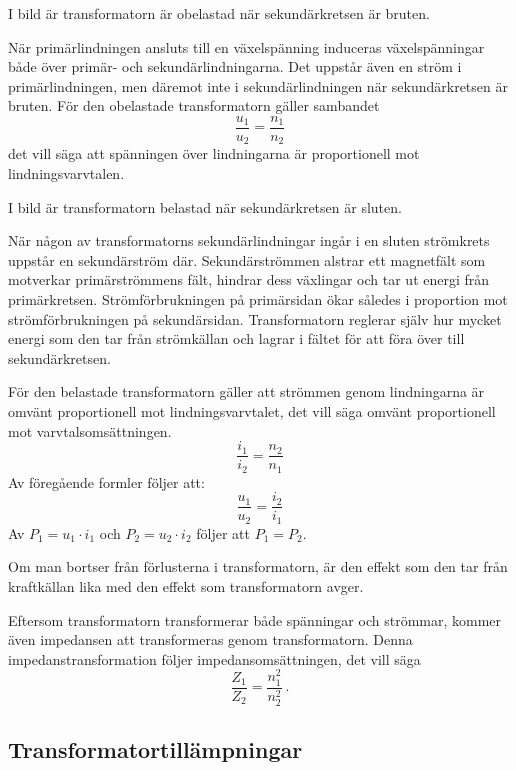 
I bild  är transformatorn är obelastad när sekundärkretsen
är bruten.

När primärlindningen ansluts till en växelspänning induceras växelspänningar
både över primär- och sekundärlindningarna.
Det uppstår även en ström i primärlindningen, men däremot inte i
sekundärlindningen när sekundärkretsen är bruten.
För den obelastade transformatorn gäller sambandet
\[\dfrac{u_1}{u_2} = \dfrac{n_1}{n_2}\]
det vill säga att spänningen över lindningarna är proportionell mot lindningsvarvtalen.

I bild  är transformatorn belastad när sekundärkretsen
är sluten.

När någon av transformatorns sekundärlindningar ingår i en sluten strömkrets 
uppstår en sekundärström där.
%
Sekundärströmmen alstrar ett magnetfält som motverkar primärströmmens fält,
hindrar dess växlingar och tar ut energi från primärkretsen.
%
Strömförbrukningen på primärsidan ökar således i proportion mot
strömförbrukningen på sekundärsidan. Transformatorn reglerar själv hur mycket
energi som den tar från strömkällan och lagrar i fältet för att föra över
till sekundärkretsen.

\newpage
För den belastade transformatorn gäller att strömmen genom lindningarna är
omvänt proportionell mot lindningsvarvtalet, det vill säga omvänt proportionell 
mot varvtalsomsättningen.
\[\dfrac{i_1}{i_2} = \dfrac{n_2}{n_1}\]
Av föregående formler följer att:
\[\dfrac{u_1}{u_2} = \dfrac{i_2}{i_1}\]
Av \(P_1 = u_1 \cdot i_1\) och \(P_2 = u_2 \cdot i_2\) följer att \(P_1 = P_2\).

Om man bortser från förlusterna i transformatorn, är den effekt som den tar
från kraftkällan lika med den effekt som transformatorn avger.

Eftersom transformatorn transformerar både spänningar och strömmar, kommer
även impedansen att transformeras genom transformatorn.
Denna impedanstransformation följer impedansomsättningen, det vill säga
\[\dfrac{Z_1}{Z_2} = \dfrac{n_1^2}{n_2^2}~.\]

\newpage
\subsection{Transformatortillämpningar}


